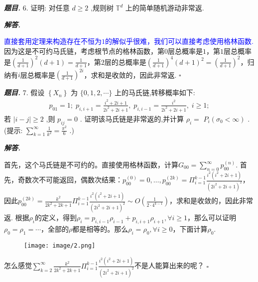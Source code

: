 \documentclass[10pt, a4paper, oneside]{ctexart}
\newenvironment{problem}{\begin{framed}\par\noindent\textbf{\textit{题目. }}}{\end{framed}\par}
\newenvironment{solution}{%
  \par\noindent\textbf{\textit{解答. }}\ignorespaces
}{%
  \hfill\ensuremath{\square}\par %
}
\begin{document}
\begin{problem}
    6. 证明: 对任意 \( d \geq  2 \) ,规则树 \( {\mathbb{T}}^{d} \) 上的简单随机游动非常返.
\end{problem}
\begin{solution}
    \textcolor{blue}{直接套用定理来构造存在不恒为$1$的解似乎很难，我们可以直接考虑使用格林函数.} 因为这是不可约马氏链，考虑根节点的格林函数，第$0$层总概率是$1$，第$1$层总概率是$(\frac{1}{d+1})^2(d+1)=\frac{1}{d+1}$，第$2$层的总概率是$(\frac{1}{d+1})^4(d+1)^2=(\frac{1}{d+1})^2$，归纳有$i$层总概率是$(\frac{1}{d+1})^{2i}$，求和是收敛的，因此非常返.
\end{solution}

\begin{problem}
    7. 假设 \( \left\{  {X}_{n}\right\}   \) 为 \( \{ 0,1,2,\cdots \}  \) 上的马氏链,转移概率如下:
\[\begin{matrix} {p}_{01} = 1;\;{p}_{i,i + 1} = \frac{{i}^{2} + {2i} + 1}{2{i}^{2} + {2i} + 1},\;{p}_{i,i - 1} = \frac{{i}^{2}}{2{i}^{2} + {2i} + 1},\;i \geq  1; \end{matrix}\]
若 \( \left| {i - j}\right|  \geq  2 \) ,则 \( {p}_{ij} = 0 \) . 证明该马氏链是非常返的,并计算 \( {\rho }_{i} =  \) \( {P}_{i}\left( {{\sigma }_{0} < \infty }\right)  \) . (提示: \( \mathop{\sum }\limits_{{k = 1}}^{\infty }\frac{1}{{k}^{2}} = \frac{{\pi }^{2}}{6} \) .)
\end{problem}

\begin{solution}
    首先，这个马氏链是不可约的。直接使用格林函数，计算$G_{00}=\sum_{n=0}^{\infty}p_{00}^{(n)}$. 首先，奇数次不可能返回，偶数次结果：$p_{00}^{(0)}=0,\dots, p_{00}^{(2k)}=\Pi_{i=1}^{k-1}\frac{i^2(i^2+2i+1)}{(2i^2+2i+1)^2}$，因此$p_{00}^{(2k)}=\frac{k^2}{2k^2+2k+1}\Pi_{i=1}^{k-1}\frac{i^2(i^2+2i+1)}{(2i^2+2i+1)^2}\sim O(\frac{1}{2\cdot 4^{k-1}})$，求和是收敛的，因此非常返. 根据$\rho_i$的定义，得到$\rho_i=p_{i,i-1}\rho_{i-1}+p_{i,i+1}\rho_{i+1},\forall i\geq 1$，那么可以证明$\rho_0=\rho_1=\cdots$，全部的$\rho$都是相等的。那么$\rho_i=\rho_0,\forall i\geq 0$，下面计算$\rho_0$.
    \begin{figure}[h]
        \centering
        \texttt{[image: image/2.png]}
    \end{figure}
    怎么感觉$\sum_{k=2}^{\infty}\frac{k^2}{2k^2+2k+1}\Pi_{i=1}^{k-1}\frac{i^2(i^2+2i+1)}{(2i^2+2i+1)^2}$不是人能算出来的呢？
\end{solution}
\end{document}
